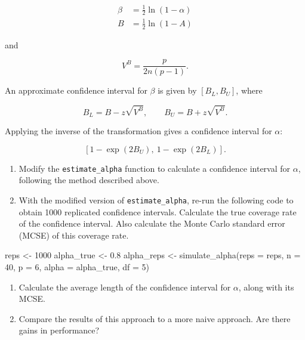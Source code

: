 \documentclass[
]{book}
\newenvironment{Shaded}{\begin{snugshade}}{\end{snugshade}}
\newcommand{\AttributeTok}[1]{\textcolor[rgb]{0.77,0.63,0.00}{#1}}
\newcommand{\DecValTok}[1]{\textcolor[rgb]{0.00,0.00,0.81}{#1}}
\newcommand{\FloatTok}[1]{\textcolor[rgb]{0.00,0.00,0.81}{#1}}
\newcommand{\FunctionTok}[1]{\textcolor[rgb]{0.00,0.00,0.00}{#1}}
\newcommand{\NormalTok}[1]{#1}
\newcommand{\OtherTok}[1]{\textcolor[rgb]{0.56,0.35,0.01}{#1}}
\begin{document}
\[
\begin{aligned}
\beta &= \frac{1}{2} \ln\left(1 - \alpha\right) \\
B &= \frac{1}{2} \ln\left(1 - A\right)
\end{aligned}
\]

and

\[
V^B = \frac{p}{2 n (p - 1)}.
\]

An approximate confidence interval for \(\beta\) is given by \([B_L, B_U]\), where

\[
B_L = B - z \sqrt{V^B}, \qquad B_U = B + z \sqrt{V^B}.
\]

Applying the inverse of the transformation gives a confidence interval for \(\alpha\):

\[
\left[1 - \exp(2B_U), \ 1 - \exp(2 B_L)\right].
\]

\begin{enumerate}
\def\labelenumi{\arabic{enumi}.}
\setcounter{enumi}{5}
\item
  Modify the \texttt{estimate\_alpha} function to calculate a confidence interval for \(\alpha\), following the method described above.
\item
  With the modified version of \texttt{estimate\_alpha}, re-run the following code to obtain 1000 replicated confidence intervals. Calculate the true coverage rate of the confidence interval. Also calculate the Monte Carlo standard error (MCSE) of this coverage rate.
\end{enumerate}

\begin{Shaded}
\begin{Highlighting}[]
\NormalTok{reps }\OtherTok{\textless{}{-}} \DecValTok{1000}
\NormalTok{alpha\_true }\OtherTok{\textless{}{-}} \FloatTok{0.8}
\NormalTok{alpha\_reps }\OtherTok{\textless{}{-}} \FunctionTok{simulate\_alpha}\NormalTok{(}\AttributeTok{reps =}\NormalTok{ reps, }\AttributeTok{n =} \DecValTok{40}\NormalTok{, }\AttributeTok{p =} \DecValTok{6}\NormalTok{, }\AttributeTok{alpha =}\NormalTok{ alpha\_true, }\AttributeTok{df =} \DecValTok{5}\NormalTok{)}
\end{Highlighting}
\end{Shaded}

\begin{enumerate}
\def\labelenumi{\arabic{enumi}.}
\setcounter{enumi}{7}
\item
  Calculate the average length of the confidence interval for \(\alpha\), along with its MCSE.
\item
  Compare the results of this approach to a more naive approach. Are there gains in performance?
\end{enumerate}
\end{document}
